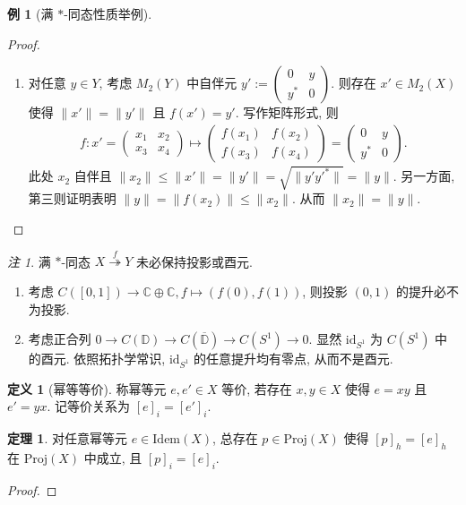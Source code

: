 \documentclass{MainStyle}
\theoremstyle{definition}
\newtheorem{example}{例}
\theoremstyle{definition}
\theoremstyle{definition}
\newtheorem{definition}{定义}
\theoremstyle{definition}
\theoremstyle{definition}
\theoremstyle{definition}
\theoremstyle{definition}
\newtheorem{theorem}{定理}
\theoremstyle{remark}
\newtheorem{remark}{注}
\theoremstyle{remark}
\begin{document}
\begin{example}[满 $\ast$-同态性质举例]
\begin{proof}
\begin{enumerate}
            \item 对任意 $y\in Y$, 考虑 $M_2(Y)$ 中自伴元 $y':=\begin{pmatrix}0&y\\y^\ast&0\end{pmatrix}$. 则存在 $x'\in M_2(X)$ 使得 $\|x'\|=\|y'\|$ 且 $f(x')=y'$. 写作矩阵形式, 则
                  \begin{align*}
                      f:x'=\begin{pmatrix}x_1&x_2\\x_3&x_4\end{pmatrix}\mapsto \begin{pmatrix}f(x_1)&f(x_2)\\f(x_3)&f(x_4)\end{pmatrix}=\begin{pmatrix}0&y\\y^\ast&0\end{pmatrix}.
                  \end{align*}
                  此处 $x_2$ 自伴且 $\|x_2\|\leq \|x'\|=\|y'\|=\sqrt{\|y'y'^\ast\|}=\|y\|$. 另一方面, 第三则证明表明 $\|y\|=\|f(x_2)\|\leq \|x_2\|$. 从而 $\|x_2\|=\|y\|$.
        \end{enumerate}
    \end{proof}
\end{example}

\begin{remark}
    满 $\ast$-同态 $X\overset{f}{\twoheadrightarrow} Y$ 未必保持投影或酉元.
    \begin{enumerate}
        \item 考虑 $C([0,1])\to \mathbb C\oplus \mathbb C, f\mapsto (f(0),f(1))$, 则投影 $(0,1)$ 的提升必不为投影.
        \item 考虑正合列 $0\to C(\mathbb D)\to C(\overline{\mathbb D})\to C(S^1)\to 0$. 显然 $\mathrm{id}_{S^1}$ 为 $C(S^1)$ 中的酉元. 依照拓扑学常识, $\mathrm{id}_{S^1}$ 的任意提升均有零点, 从而不是酉元.
    \end{enumerate}
\end{remark}

\begin{definition}[幂等等价]
    称幂等元 $e,e'\in X$ 等价, 若存在 $x,y\in X$ 使得 $e=xy$ 且 $e'=yx$. 记等价关系为 $[e]_i=[e']_i$.
\end{definition}

\begin{theorem}
    对任意幂等元 $e\in\mathrm{Idem}(X)$, 总存在 $p\in \mathrm{Proj}(X)$ 使得 $[p]_h=[e]_h$ 在 $\mathrm{Proj}(X)$ 中成立, 且 $[p]_i=[e]_i$.
    \begin{proof}

    \end{proof}
\end{theorem}
\end{document}
